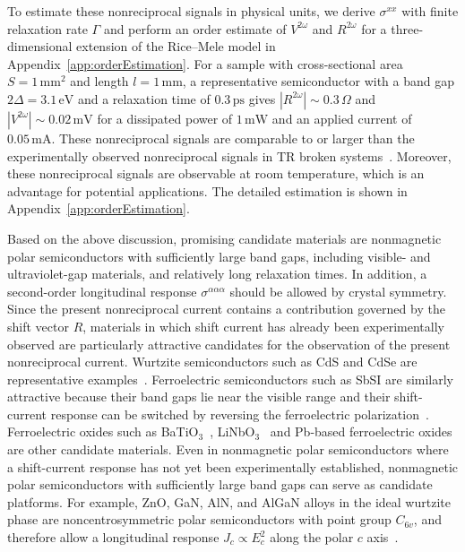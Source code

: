 \documentclass[twocolumn,superscriptaddress]{revtex4-1}
\begin{document}
To estimate these nonreciprocal signals in physical units, we derive $\sigma^{xx}$ with finite relaxation rate $\Gamma$ and perform an order estimate of $V^{2\omega}$ and $R^{2\omega}$ for a three-dimensional extension of the Rice--Mele model in Appendix~\ref{app:orderEstimation}.
For a sample with cross-sectional area $S=1\,\mathrm{mm}^2$ and length $l=1\,\mathrm{mm}$, a representative semiconductor with a band gap $2\Delta=3.1\,\mathrm{eV}$ and a relaxation time of $0.3\,\mathrm{ps}$ gives $|R^{2\omega}|\sim 0.3\,\Omega$ and $|V^{2\omega}|\sim 0.02\,\mathrm{mV}$ for a dissipated power of $1\,\mathrm{mW}$ and an applied current of $0.05\,\mathrm{mA}$.
These nonreciprocal signals are comparable to or larger than the experimentally observed nonreciprocal signals in TR broken systems~\cite{Ideue2017,Yokouchi2017,Wakatsuki2017,Yasuda2019,Itahashi2020,Zhang2020,Nakamura2025,Li2021,Wang2022,Wakamura2024}.
Moreover, these nonreciprocal signals are observable at room temperature, which is an advantage for potential applications.
The detailed estimation is shown in Appendix~\ref{app:orderEstimation}.

Based on the above discussion, promising candidate materials are nonmagnetic polar semiconductors with sufficiently large band gaps, including visible- and ultraviolet-gap materials, and relatively long relaxation times.
In addition, a second-order longitudinal response $\sigma^{\alpha\alpha\alpha}$ should be allowed by crystal symmetry.
Since the present nonreciprocal current contains a contribution governed by the shift vector $R$, materials in which shift current has already been experimentally observed are particularly attractive candidates for the observation of the present nonreciprocal current.
Wurtzite semiconductors such as CdS and CdSe are representative examples~\cite{Laman2005,Sotome2021}.
Ferroelectric semiconductors such as SbSI are similarly attractive because their band gaps lie near the visible range and their shift-current response can be switched by reversing the ferroelectric polarization~\cite{Ogawa2017,Sotome2019}.
Ferroelectric oxides such as BaTiO$_3$~\cite{Koch1975,Okamura2022}, LiNbO$_3$~\cite{Glass1974,Dalba1995} and Pb-based ferroelectric oxides~\cite{Yang2000,Poosanaas1998,Pintilie2007} are other candidate materials.
Even in nonmagnetic polar semiconductors where a shift-current response has not yet been experimentally established, nonmagnetic polar semiconductors with sufficiently large band gaps can serve as candidate platforms.
For example, ZnO, GaN, AlN, and AlGaN alloys in the ideal wurtzite phase are noncentrosymmetric polar semiconductors with point group $C_{6v}$, and therefore allow a longitudinal response $J_c\propto E_c^2$ along the polar $c$ axis~\cite{Vurgaftman2003,Ozgur2005}.
\end{document}

